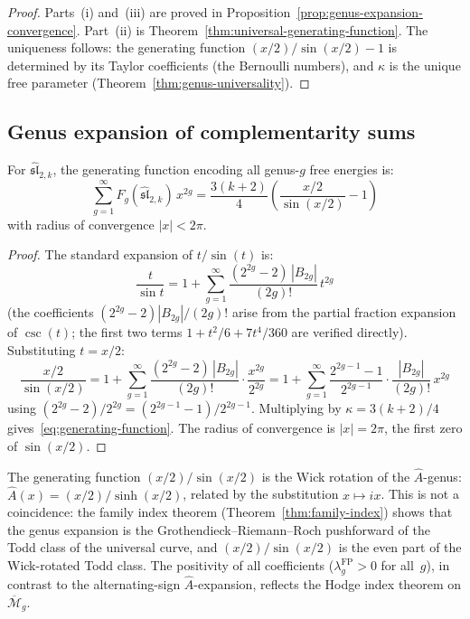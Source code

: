 \begin{proof}
Parts~(i) and~(iii) are proved in Proposition~\ref{prop:genus-expansion-convergence}.  Part~(ii) is Theorem~\ref{thm:universal-generating-function}.  The uniqueness follows: the generating function $(x/2)/\sin(x/2) - 1$ is determined by its Taylor coefficients (the Bernoulli numbers), and $\kappa$ is the unique free parameter (Theorem~\ref{thm:genus-universality}).
\end{proof}

\subsection{Genus expansion of complementarity sums}\label{subsec:complementarity-sums}

\begin{proposition}\label{prop:complementarity-genus-series}
For $\widehat{\mathfrak{sl}}_{2,k}$, the generating function encoding all genus-$g$ free energies is:
\begin{equation}\label{eq:generating-function}
\sum_{g=1}^{\infty} F_g(\widehat{\mathfrak{sl}}_{2,k}) \, x^{2g} = \frac{3(k+2)}{4} \left(\frac{x/2}{\sin(x/2)} - 1\right)
\end{equation}
with radius of convergence $|x| < 2\pi$.
\end{proposition}

\begin{proof}
The standard expansion of $t/\sin(t)$ is:
\[
\frac{t}{\sin t} = 1 + \sum_{g=1}^{\infty} \frac{(2^{2g}-2)\,|B_{2g}|}{(2g)!}\, t^{2g}
\]
(the coefficients $(2^{2g}-2)|B_{2g}|/(2g)!$ arise from the partial fraction expansion of $\csc(t)$; the first two terms $1 + t^2/6 + 7t^4/360$ are verified directly).  Substituting $t = x/2$:
\[
\frac{x/2}{\sin(x/2)} = 1 + \sum_{g=1}^{\infty} \frac{(2^{2g}-2)\,|B_{2g}|}{(2g)!} \cdot \frac{x^{2g}}{2^{2g}}
= 1 + \sum_{g=1}^{\infty} \frac{2^{2g-1}-1}{2^{2g-1}} \cdot \frac{|B_{2g}|}{(2g)!}\, x^{2g}
\]
using $(2^{2g}-2)/2^{2g} = (2^{2g-1}-1)/2^{2g-1}$.  Multiplying by $\kappa = 3(k+2)/4$ gives~\eqref{eq:generating-function}.  The radius of convergence is $|x| = 2\pi$, the first zero of $\sin(x/2)$.
\end{proof}

\begin{remark}\label{rem:A-hat-genus}
The generating function $(x/2)/\sin(x/2)$ is the Wick rotation of the $\hat{A}$-genus: $\hat{A}(x) = (x/2)/\sinh(x/2)$, related by the substitution $x \mapsto ix$.  This is not a coincidence: the family index theorem (Theorem~\ref{thm:family-index}) shows that the genus expansion is the Grothendieck--Riemann--Roch pushforward of the Todd class of the universal curve, and $(x/2)/\sin(x/2)$ is the even part of the Wick-rotated Todd class.  The positivity of all coefficients ($\lambda_g^{\mathrm{FP}} > 0$ for all~$g$), in contrast to the alternating-sign $\hat{A}$-expansion, reflects the Hodge index theorem on $\overline{\mathcal{M}}_g$.
\end{remark}

